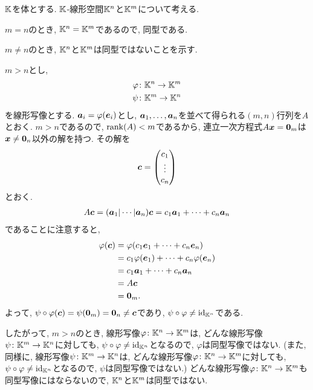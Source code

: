 \begin{example}
  $\mathbb{K}$を体とする.
  $\mathbb{K}$-線形空間$\mathbb{K}^n$と$\mathbb{K}^m$について考える.

  $m=n$のとき, $\mathbb{K}^n=\mathbb{K}^m$であるので, 同型である.

  $m\neq n$のとき, $\mathbb{K}^n$と$\mathbb{K}^m$は同型ではないことを示す.

  $m>n$とし,
  \begin{align*}
    \varphi&\colon \mathbb{K}^n \to \mathbb{K}^m\\
    \psi&\colon \mathbb{K}^m \to \mathbb{K}^n
  \end{align*}
  を線形写像とする.
  $\boldsymbol{a}_i=\varphi(\boldsymbol{e}_i)$とし,
  $\boldsymbol{a}_1,\ldots,\boldsymbol{a}_n$を並べて得られる$(m,n)$行列を$A$とおく.
  $m>n$であるので, $\operatorname{rank}(A)<m$であるから,
  連立一次方程式$A\boldsymbol{x}=\boldsymbol{0}_m$は$\boldsymbol{x}\neq \boldsymbol{0}_n$以外の解を持つ.
  その解を
  \begin{align*}
    \boldsymbol{c}=\begin{pmatrix}c_1\\\vdots\\c_n\end{pmatrix}
  \end{align*}
  とおく.
  \begin{align*}
    A\boldsymbol{c}=(\boldsymbol{a}_1|\cdots|\boldsymbol{a}_n)\boldsymbol{c}=c_1\boldsymbol{a}_1+\cdots+c_n\boldsymbol{a}_n
  \end{align*}
  であることに注意すると,
  \begin{align*}
    \varphi(\boldsymbol{c})&=\varphi(c_1\boldsymbol{e}_1+\cdots+c_n\boldsymbol{e}_n)\\
    &=c_1\varphi(\boldsymbol{e}_1)+\cdots+c_n\varphi(\boldsymbol{e}_n)\\
    &=c_1\boldsymbol{a}_1+\cdots+c_n\boldsymbol{a}_n\\
    &=A\boldsymbol{c}\\
    &=\boldsymbol{0}_m.
  \end{align*}
  よって,
  $\psi\circ\varphi(\boldsymbol{c})=\psi(\boldsymbol{0}_m)=\boldsymbol{0}_n\neq \boldsymbol{c}$であり,
  $\psi\circ\varphi\neq \operatorname{id}_{\mathbb{K}^n}$である.

  したがって,
  $m>n$のとき,
  線形写像$\varphi\colon \mathbb{K}^n \to \mathbb{K}^m$は,
  どんな線形写像$\psi\colon \mathbb{K}^m\to \mathbb{K}^n$に対しても,
  $\psi\circ \varphi \neq \operatorname{id}_{\mathbb{K}^n}$となるので,
  $\varphi$は同型写像ではない.
  (また, 同様に,
  線形写像$\psi\colon \mathbb{K}^m \to \mathbb{K}^n$は,
  どんな線形写像$\varphi\colon \mathbb{K}^n\to \mathbb{K}^m$に対しても,
  $\psi\circ \varphi \neq \operatorname{id}_{\mathbb{K}^n}$となるので,
  $\psi$は同型写像ではない.)
  どんな線形写像$\varphi\colon \mathbb{K}^n \to \mathbb{K}^m$も同型写像にはならないので,
  $\mathbb{K}^n$と$\mathbb{K}^m$は同型ではない.
\end{example}

